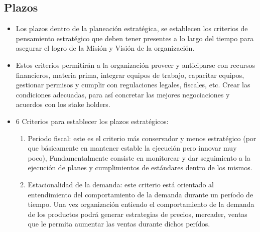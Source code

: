 
\subsection{Plazos}
\begin{itemize}
    \item Los plazos dentro de la planeación estratégica, se establecen los criterios de pensamiento estratégico que deben tener presentes a lo largo del tiempo para asegurar el logro de la Misión y Visión de la organización. 
    \item Estos criterios permitirán a la organización proveer y anticiparse con recursos financieros, materia prima, integrar equipos de trabajo, capacitar equipos, gestionar permisos y cumplir con regulaciones legales, fiscales, etc. Crear las condiciones adecuadas, para así concretar las mejores negociaciones y acuerdos con los stake holders. 
    \item 6 Criterios para establecer los plazos estratégicos:
        \begin{enumerate}
            \item Periodo fiscal: este es el criterio más conservador y menos estratégico (por que básicamente en mantener estable la ejecución pero innovar muy poco), Fundamentalmente consiste en monitorear y dar seguimiento a la ejecución de planes y cumplimientos de estándares dentro de los mismos.
            \item Estacionalidad de la demanda: este criterio está orientado al entendimiento del comportamiento de la demanda durante un período de tiempo. Una vez organización entiendo el comportamiento de la demanda de los productos podrá generar estrategias de precios, mercader, ventas que le permita aumentar las ventas durante dichos perídos.
        \end{enumerate}
\end{itemize}
